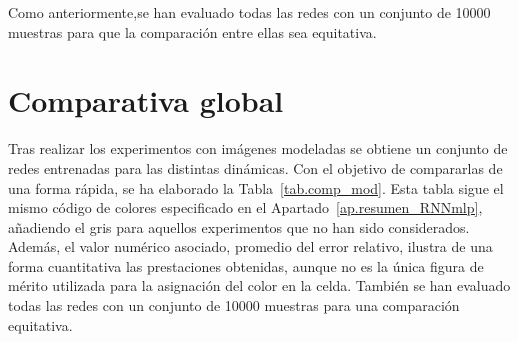 Como anteriormente,se han evaluado todas las redes con un conjunto de 10000 muestras para que la comparación entre ellas sea equitativa.

\section{Comparativa global} \label{sec.comp_mod}
Tras realizar los experimentos con imágenes modeladas se obtiene un conjunto de redes entrenadas para las distintas dinámicas. Con el objetivo de compararlas de una forma rápida, se ha elaborado la Tabla~\ref{tab.comp_mod}. Esta tabla sigue el mismo código de colores especificado en el Apartado~\ref{ap.resumen_RNNmlp}, añadiendo el gris para aquellos experimentos que no han sido considerados. Además, el valor numérico asociado, promedio del error relativo, ilustra de una forma cuantitativa las prestaciones obtenidas, aunque no es la única figura de mérito utilizada para la asignación del color en la celda. También se han evaluado todas las redes con un conjunto de 10000 muestras para una comparación equitativa.

